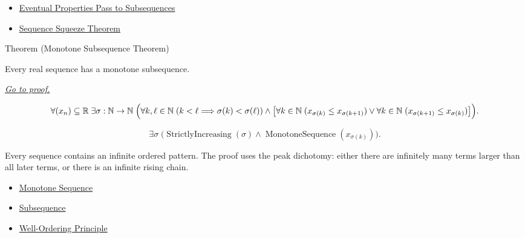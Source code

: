 \begin{dependencies}
\begin{itemize}
  \item \hyperref[thm:eventual-properties-pass-to-subsequences]{Eventual Properties Pass to Subsequences}
  \item \hyperref[thm:sequence-squeeze-theorem]{Sequence Squeeze Theorem}
\end{itemize}
\end{dependencies}


\begin{theorembox}{Theorem (Monotone Subsequence Theorem)}
\begin{theorem}
\label{thm:monotone-subsequence-theorem}
Every real sequence has a monotone subsequence.

\smallskip
\noindent
\hyperref[prf:monotone-subsequence-theorem]{\textit{Go to proof.}}
\end{theorem}
\end{theorembox}

\begin{remark*}
\[
\forall (x_n)\subseteq\mathbb{R}\;\exists \sigma:\mathbb{N}\to\mathbb{N}\;
\Bigl(
  \forall k,\ell\in\mathbb{N}\;(k<\ell\Longrightarrow\sigma(k)<\sigma(\ell))
  \land
  \bigl[
    \forall k\in\mathbb{N}\;(x_{\sigma(k)}\le x_{\sigma(k+1)})
    \lor
    \forall k\in\mathbb{N}\;(x_{\sigma(k+1)}\le x_{\sigma(k)})
  \bigr]
\Bigr).
\]
\end{remark*}

\begin{remark*}
\[
\exists \sigma\;\bigl(
\operatorname{StrictlyIncreasing}(\sigma)
\land
\operatorname{MonotoneSequence}(x_{\sigma(k)})
\bigr).
\]
\end{remark*}

\begin{remark*}[Interpretation]
Every sequence contains an infinite ordered pattern. The proof uses the peak
dichotomy: either there are infinitely many terms larger than all later terms,
or there is an infinite rising chain.
\end{remark*}

\begin{dependencies}
\begin{itemize}
  \item \hyperref[def:monotone-sequence]{Monotone Sequence}
  \item \hyperref[def:subsequence]{Subsequence}
  \item \hyperref[thm:well-ordering-principle]{Well-Ordering Principle}
\end{itemize}
\end{dependencies}

